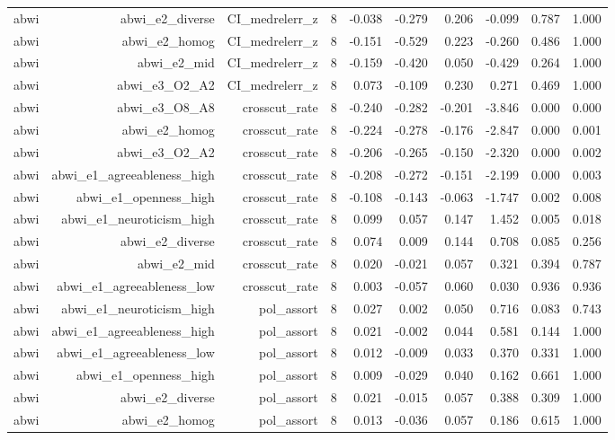 \documentclass[11pt]{article}
\begin{document}
\begin{landscape}
\begin{longtable}{@{}lrrrrrrrrr@{}}
abwi & abwi\_e2\_diverse & CI\_medrelerr\_z & 8 & -0.038 & -0.279 & 0.206 & -0.099 & 0.787 & 1.000 \\
abwi & abwi\_e2\_homog & CI\_medrelerr\_z & 8 & -0.151 & -0.529 & 0.223 & -0.260 & 0.486 & 1.000 \\
abwi & abwi\_e2\_mid & CI\_medrelerr\_z & 8 & -0.159 & -0.420 & 0.050 & -0.429 & 0.264 & 1.000 \\
abwi & abwi\_e3\_O2\_A2 & CI\_medrelerr\_z & 8 & 0.073 & -0.109 & 0.230 & 0.271 & 0.469 & 1.000 \\
abwi & abwi\_e3\_O8\_A8 & crosscut\_rate & 8 & -0.240 & -0.282 & -0.201 & -3.846 & 0.000 & 0.000 \\
abwi & abwi\_e2\_homog & crosscut\_rate & 8 & -0.224 & -0.278 & -0.176 & -2.847 & 0.000 & 0.001 \\
abwi & abwi\_e3\_O2\_A2 & crosscut\_rate & 8 & -0.206 & -0.265 & -0.150 & -2.320 & 0.000 & 0.002 \\
abwi & abwi\_e1\_agreeableness\_high & crosscut\_rate & 8 & -0.208 & -0.272 & -0.151 & -2.199 & 0.000 & 0.003 \\
abwi & abwi\_e1\_openness\_high & crosscut\_rate & 8 & -0.108 & -0.143 & -0.063 & -1.747 & 0.002 & 0.008 \\
abwi & abwi\_e1\_neuroticism\_high & crosscut\_rate & 8 & 0.099 & 0.057 & 0.147 & 1.452 & 0.005 & 0.018 \\
abwi & abwi\_e2\_diverse & crosscut\_rate & 8 & 0.074 & 0.009 & 0.144 & 0.708 & 0.085 & 0.256 \\
abwi & abwi\_e2\_mid & crosscut\_rate & 8 & 0.020 & -0.021 & 0.057 & 0.321 & 0.394 & 0.787 \\
abwi & abwi\_e1\_agreeableness\_low & crosscut\_rate & 8 & 0.003 & -0.057 & 0.060 & 0.030 & 0.936 & 0.936 \\
abwi & abwi\_e1\_neuroticism\_high & pol\_assort & 8 & 0.027 & 0.002 & 0.050 & 0.716 & 0.083 & 0.743 \\
abwi & abwi\_e1\_agreeableness\_high & pol\_assort & 8 & 0.021 & -0.002 & 0.044 & 0.581 & 0.144 & 1.000 \\
abwi & abwi\_e1\_agreeableness\_low & pol\_assort & 8 & 0.012 & -0.009 & 0.033 & 0.370 & 0.331 & 1.000 \\
abwi & abwi\_e1\_openness\_high & pol\_assort & 8 & 0.009 & -0.029 & 0.040 & 0.162 & 0.661 & 1.000 \\
abwi & abwi\_e2\_diverse & pol\_assort & 8 & 0.021 & -0.015 & 0.057 & 0.388 & 0.309 & 1.000 \\
abwi & abwi\_e2\_homog & pol\_assort & 8 & 0.013 & -0.036 & 0.057 & 0.186 & 0.615 & 1.000 \\

\end{longtable}
\end{landscape}
\end{document}
